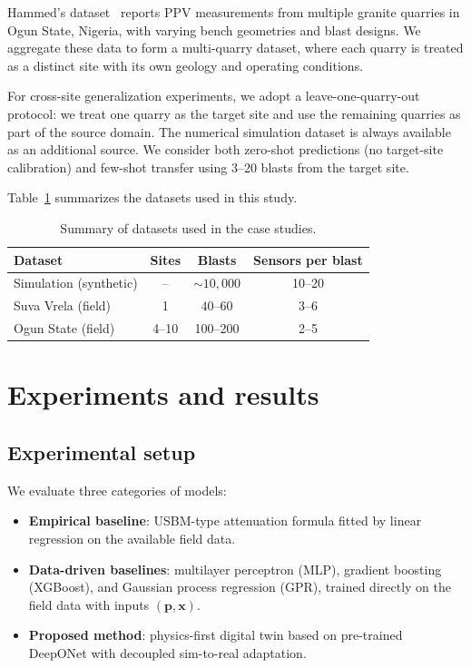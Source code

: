 \documentclass[a4paper,fleqn]{cas-sc}
\begin{document}
Hammed's dataset~\citep{Hammed2019PPVData} reports PPV measurements
from multiple granite quarries in Ogun State, Nigeria,
with varying bench geometries and blast designs.
We aggregate these data to form a multi-quarry dataset,
where each quarry is treated as a distinct site with its own geology and operating conditions.

For cross-site generalization experiments,
we adopt a leave-one-quarry-out protocol:
we treat one quarry as the target site
and use the remaining quarries as part of the source domain.
The numerical simulation dataset is always available as an additional source.
We consider both zero-shot predictions (no target-site calibration)
and few-shot transfer using 3--20 blasts from the target site.

Table~\ref{tab:datasets} summarizes the datasets used in this study.

\begin{table}[t]
\centering
\caption{Summary of datasets used in the case studies.}
\label{tab:datasets}
\begin{tabular}{lccc}
\toprule
Dataset & Sites & Blasts & Sensors per blast \\
\midrule
Simulation (synthetic) & --   & $\sim10{,}000$ & 10--20 \\
Suva Vrela (field)     & 1    & $40$--$60$     & 3--6   \\
Ogun State (field)     & 4--10 & 100--200      & 2--5   \\
\bottomrule
\end{tabular}
\end{table}

\section{Experiments and results}
\label{sec:experiments}

\subsection{Experimental setup}

We evaluate three categories of models:
\begin{itemize}
  \item \textbf{Empirical baseline}:
        USBM-type attenuation formula fitted by linear regression on the available field data.
  \item \textbf{Data-driven baselines}:
        multilayer perceptron (MLP), gradient boosting (XGBoost),
        and Gaussian process regression (GPR),
        trained directly on the field data with inputs $(\mathbf{p},\mathbf{x})$.
  \item \textbf{Proposed method}:
        physics-first digital twin based on pre-trained DeepONet
        with decoupled sim-to-real adaptation.
\end{itemize}
\end{document}
